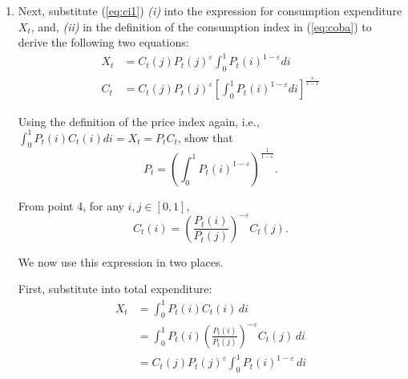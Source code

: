 \documentclass[dvipsnames,11pt]{article}
\begin{document}
\begin{enumerate}
\begin{solution}
Taking the ratio of the two FOCs eliminates the common term and the Lagrange multiplier:
\[
\frac{C_t(i)^{-\frac{1}{\varepsilon}}}{C_t(j)^{-\frac{1}{\varepsilon}}}
=
\frac{P_t(i)}{P_t(j)}.
\]

This implies
\[
\left(\frac{C_t(i)}{C_t(j)}\right)^{-\frac{1}{\varepsilon}}
=
\frac{P_t(i)}{P_t(j)}.
\]

Raising both sides to the power \(-\varepsilon\), we obtain
\[
\frac{C_t(i)}{C_t(j)}
=
\left(\frac{P_t(i)}{P_t(j)}\right)^{-\varepsilon}
=
\left(\frac{P_t(j)}{P_t(i)}\right)^{\varepsilon}.
\]

Therefore,
\[
C_t(i)=\left(\frac{P_t(i)}{P_t(j)}\right)^{-\varepsilon} C_t(j).
\]

\end{solution}

            \item Next, substitute (\ref{eq:ci1}) \textit{(i)} into the expression for consumption expenditure $X_t$, and, \textit{(ii)} in the definition of the consumption index in (\ref{eq:coba}) to derive the following two equations: 
            \begin{align*}
                X_t &= C_t(j)P_t(j)^{\varepsilon}\int_0^1P_t(i)^{1-\varepsilon}di \\
                C_t &= C_t(j)P_t(j)^{\varepsilon} \left[ \int_0^1P_t(i)^{1-\varepsilon}di \right]^{\frac{\varepsilon}{\varepsilon-1}}
            \end{align*}
            
            Using the definition of the price index again, i.e., $\int_0^1P_t(i)C_t(i)di =X_t= P_t C_t$, show that 
            \begin{equation}
                P_{t} = \left( \int_0^1P_t(i)^{1-\varepsilon}  \right)^{\frac{1}{1-\varepsilon}}.
            \end{equation}

\begin{solution}

From point 4, for any \(i,j\in[0,1]\),
\[
C_t(i)=\left(\frac{P_t(i)}{P_t(j)}\right)^{-\varepsilon}C_t(j).
\]

We now use this expression in two places.

First, substitute into total expenditure:
\begin{align*}
X_t& =\int_0^1 P_t(i)C_t(i)\,di \\
& = \int_0^1 P_t(i)\left(\frac{P_t(i)}{P_t(j)}\right)^{-\varepsilon}C_t(j)\,di \\
& = C_t(j)P_t(j)^{\varepsilon}\int_0^1 P_t(i)^{1-\varepsilon}\,di
\end{align*}


\end{solution}
\end{enumerate}
\end{document}
